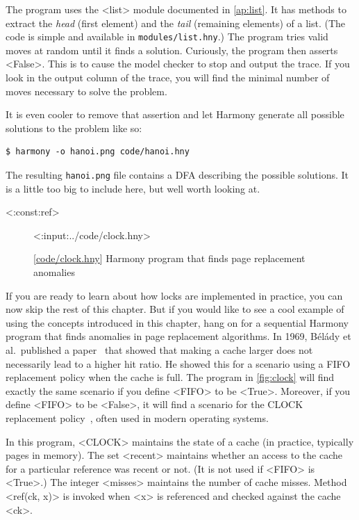 \documentclass{report}
\newcommand{\harmonylink}[1]{%
[\href{https://harmony.cs.cornell.edu/#1}{\underline{#1}}]%
}
\newenvironment{code}{
\tcolorbox
}{
\endtcolorbox
}
\begin{document}
The program uses the <{list}> module documented in \autoref{ap:list}.
It has methods to extract the \emph{head} (first element) and
the \emph{tail} (remaining elements) of a list.
(The code is simple and available in \texttt{modules/list.hny}.)
The program tries valid moves at random until it finds a solution.
Curiously, the program then asserts <{False}>.  This is to cause
the model checker to stop and output the trace.  If you look in the
output column of the trace, you will find the minimal number of moves
necessary to solve the problem.

It is even cooler to remove that assertion and let Harmony generate
all possible solutions to the problem like so:

\begin{code}
\begin{verbatim}
$ harmony -o hanoi.png code/hanoi.hny
\end{verbatim}
\end{code}

The resulting \texttt{hanoi.png} file contains a DFA describing
the possible solutions.  It is a little too big to include here,
but well worth looking at.

<{:const:ref}>
\begin{figure}
\begin{code}
<{:input:../code/clock.hny}>
\end{code}
\caption{\harmonylink{code/clock.hny} Harmony program that finds page replacement anomalies}
\label{fig:clock}
\end{figure}

If you are ready to learn about how locks are implemented in practice,
you can now skip the rest of this chapter.  But if you would like to
see a cool example of using the concepts introduced in this chapter,
hang on for a sequential Harmony program that finds anomalies in page
replacement algorithms.
In 1969, B\'{e}l\'{a}dy et al.~published a paper~\cite{Belady69}
that showed that making a
cache larger does not necessarily lead to a higher hit ratio.  He showed
this for a scenario using a FIFO replacement policy when the cache is full. 
The program in \autoref{fig:clock} will find exactly the same scenario
if you define <{FIFO}> to be <{True}>.  Moreover, if you define
<{FIFO}> to be <{False}>, it will find a scenario for the
CLOCK replacement policy~\cite{clock}, often used in modern operating systems.

In this program, <{CLOCK}> maintains the state of a cache
(in practice, typically pages in memory).
The set <{recent}> maintains whether an access to the cache
for a particular reference was recent or not.
(It is not used if <{FIFO}> is <{True}>.)
The integer <{misses}> maintains the number of cache misses.
Method <{ref(ck, x)}> is invoked when <{x}> is
referenced and checked against the cache <{ck}>.
\end{document}
